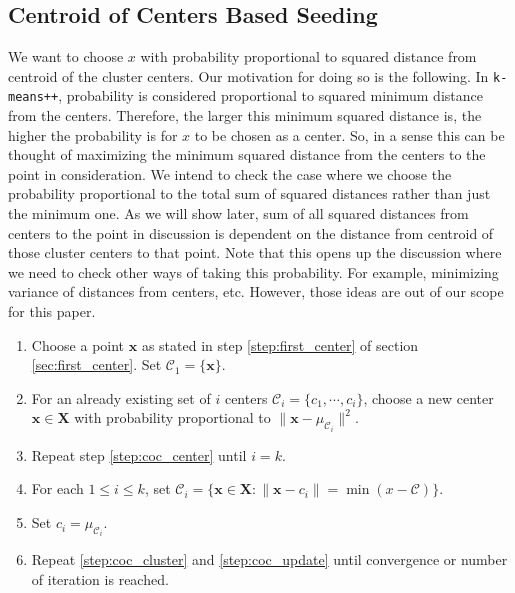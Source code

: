 \documentclass[twoside, 11pt]{article}
\newcommand{\x}{\mathbf{x}}
\newcommand{\X}{\mathbf{X}}
\newcommand{\C}{\mathcal{C}}
\begin{document}
	\subsection{Centroid of Centers Based Seeding}
	We want to choose $x$ with probability proportional to squared distance from centroid of the cluster centers. Our motivation for doing so is the following. In \texttt{k-means++}, probability is considered proportional to squared minimum distance from the centers. Therefore, the larger this minimum squared distance is, the higher the probability is for $x$ to be chosen as a center. So, in a sense this can be thought of maximizing the minimum squared distance from the centers to the point in consideration. We intend to check the case where we choose the probability proportional to the total sum of squared distances rather than just the minimum one. As we will show later, sum of all squared distances from centers to the point in discussion is dependent on the distance from centroid of those cluster centers to that point. Note that this opens up the discussion where we need to check other ways of taking this probability. For example, minimizing variance of distances from centers, etc. However, those ideas are out of our scope for this paper.
		\begin{enumerate}[i]
			\item Choose a point $\x$ as stated in step \eqref{step:first_center} of section \eqref{sec:first_center}. Set $\C_1=\{\x\}$.
			\item For an already existing set of $i$ centers $\mathcal{C}_i=\{c_1,\cdots,c_i\}$, choose a new center $\x\in\X$ with probability proportional to $\|\x-\mu_{\C_i}\|^2$.\label{step:coc_center}
			\item Repeat step \eqref{step:coc_center} until $i=k$.
			\item For each $1\leq i\leq k$, set $\C_i=\{\x\in\X:\|\x-c_i\|=\min(x-\C)\}$.\label{step:coc_cluster}
			\item Set $c_i=\mu_{\C_i}$.\label{step:coc_update}
			\item Repeat \eqref{step:coc_cluster} and \eqref{step:coc_update} until convergence or number of iteration is reached.
		\end{enumerate}
\end{document}
